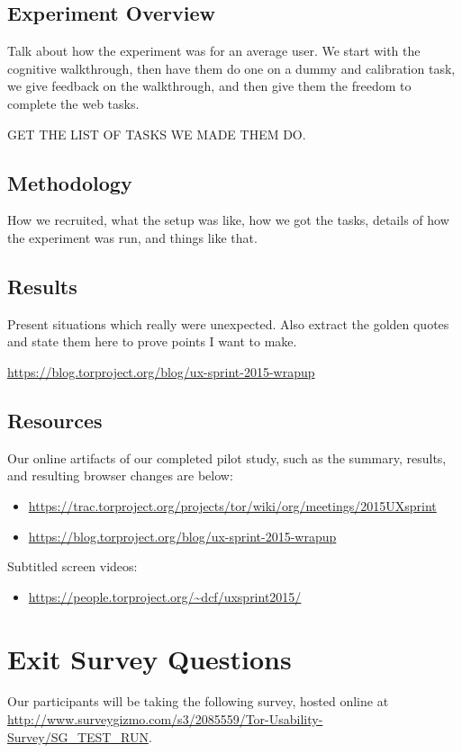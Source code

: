 \documentclass[letterpaper,twocolumn,11pt]{article}
\begin{document}
\subsection{Experiment Overview}
{\color {red} Talk about how the experiment was for an average user. We start
with the cognitive walkthrough, then have them do one on a dummy
and calibration task, we give feedback on the walkthrough, and then 
give them the freedom to complete the web tasks. 

GET THE LIST OF TASKS WE MADE THEM DO.}

\subsection{Methodology}
{\color {red} How we recruited, what the setup was like, how we got the tasks, details of 
how the experiment was run, and things like that.}

\subsection{Results}
{\color {red} Present situations which really were unexpected. 
Also extract the golden quotes and state them here 
to prove points I want to make. }

\url{https://blog.torproject.org/blog/ux-sprint-2015-wrapup}

\subsection{Resources}

Our online artifacts of our completed pilot study, such as 
the summary, results, and resulting browser changes are below:
\begin{itemize} \itemsep1pt \parskip0pt 
\item \url{https://trac.torproject.org/projects/tor/wiki/org/meetings/2015UXsprint}
\item \url{https://blog.torproject.org/blog/ux-sprint-2015-wrapup}
\end{itemize}

\noindent Subtitled screen videos:
\begin{itemize} \itemsep1pt \parskip0pt 
\item \url{https://people.torproject.org/~dcf/uxsprint2015/}
\end{itemize}

\section{Exit Survey Questions}
\label{sec:survey} 
\indent \indent Our participants will be taking the following survey, hosted online at 
\url{http://www.surveygizmo.com/s3/2085559/Tor-Usability-Survey/SG_TEST_RUN}.\\
\end{document}
